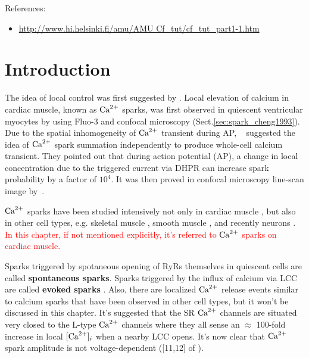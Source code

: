 References:
\begin{itemize}
\item \url{http://www.hi.helsinki.fi/amu/AMU
    Cf_tut/cf_tut_part1-1.htm} 
\end{itemize}

\section{Introduction}
\label{sec:introduction-14}

The idea of local control was first suggested by \citep{niggli1990}.
Local elevation of calcium in cardiac muscle, known as ${\text{Ca}^{2+}}$ sparks, was first
observed in quiescent ventricular myocytes by \citep{cheng1993cse} using Fluo-3
and confocal microscopy (Sect.\ref{sec:spark_cheng1993}). Due to the spatial
inhomogeneity of ${\text{Ca}^{2+}}$ transient during AP, ~\citep{cannell1994snu} suggested
the idea of ${\text{Ca}^{2+}}$ spark summation independently to produce whole-cell calcium
transient. They pointed out that during action potential (AP), a change in local
concentration due to the triggered current via DHPR can increase spark
probability by a factor of $10^4$. It was then proved in confocal microscopy
line-scan image by~\citep{cleeman1998}.

${\text{Ca}^{2+}}$ sparks have been studied intensively not only in cardiac muscle
\citep{cheng1993cse, cheng1996ecc, satoh1997, wier1997}, but also in other cell
types, e.g. skeletal muscle \citep{tsugorka1995, schneider1996,
schneider1996, baylor2005}, smooth muscle \citep{gordienko2001, nelson1995}, and
recently neurons \citep{ouyang2005, ross2012}. \textcolor{red}{In this chapter,
if not mentioned explicitly, it's referred to ${\text{Ca}^{2+}}$ sparks on
cardiac muscle.}

Sparks triggered by spotaneous opening of RyRs themselves in quiescent cells are
called {\bf spontaneous sparks}. Sparks triggered by the influx of calcium via
LCC are called {\bf evoked sparks} \citep{santana1996}. Also, there are
localized ${\text{Ca}^{2+}}$ release events similar to calcium sparks that have been observed
in other cell types, but it won't be discussed in this chapter. It's suggested
that the SR ${\text{Ca}^{2+}}$ channels are situated very closed to the L-type ${\text{Ca}^{2+}}$ channels
where they all sense an $\approx $ 100-fold increase in local $[{\text{Ca}^{2+}}]_i$ when a
nearby LCC opens. It's now clear that ${\text{Ca}^{2+}}$ spark amplitude is not
voltage-dependent ([11,12] of \citep{santana1996}).

